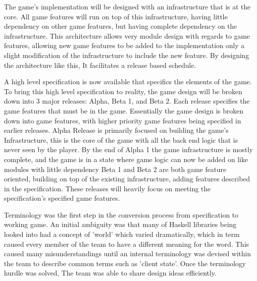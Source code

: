 %

The game's implementation will be designed with an infrastructure that is at the core. All game features will run on top of this infrastructure, having little dependency on other game features, but having complete dependency on the infrastructure. This architecture allows very module design with regards to game features, allowing new game features to be added to the implementation only a slight modification of the infrastructure to include the new feature. By designing the architecture like this, It facilitates a release based schedule.

A high level specification is now available that specifics the elements of the game. To bring this high level specification to reality, the game design will be broken down into 3 major releases: Alpha, Beta 1, and Beta 2. Each release specifies the game features that must be in the game. Essentially the game design is broken down into game features, with higher priority game features being specified in earlier releases.
Alpha Release is primarily focused on building the game's Infrastructure, this is the core of the game with all the back end logic that is never seen by the player. By the end of Alpha 1 the game infrastructure is mostly complete, and the game is in a state where game logic can now be added on like modules with little dependency 
Beta 1 and Beta 2 are both game feature oriented, building on top of the existing infrastructure, adding features described in the specification. These releases will heavily focus on meeting the specification's specified game features.

Terminology was the first step in the conversion process from specification to working game. 
An initial ambiguity was that many of Haskell libraries being looked into had a concept of 'world' which varied dramatically, which in term caused every member of the team to have a different meaning for the word. This caused many misunderstandings until an internal terminology was devised within the team to describe common terms such as 'client state'. Once the terminology hurdle was solved, The team was able to share design ideas efficiently.

